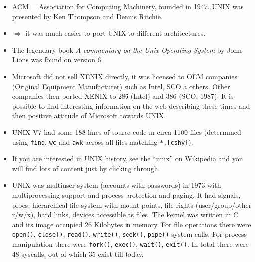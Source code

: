 \begin{itemize}
\item ACM = Association for Computing Machinery, founded in 1947. UNIX was
presented by Ken Thompson and Dennis Ritchie.
\item {} $\Rightarrow$ it was much easier to port UNIX to
different architectures.
\item The legendary book \emph{A commentary on the Unix
Operating System} by John Lions was found on version 6.
\item Microsoft did not sell XENIX directly, it was licensed to OEM companies
(Original Equipment Manufacturer) such as Intel, SCO a others. Other companies
then ported XENIX to 286 (Intel) and 386 (SCO, 1987). It is possible to find
interesting information on the web describing these times and then positive
attitude of Microsoft towards UNIX.
\item UNIX V7 had some 188 lines of source code in circa
1100 files (determined using \texttt{find}, \texttt{wc} and \texttt{awk}
across all files matching \texttt{*.[cshy]}).
\item If you are interested in UNIX history, see the ``u{}nix'' on Wikipedia and
you will find lots of content just by clicking through.
\item UNIX was multiuser system (accounts with passwords) in 1973 with
multiprocessing support and process protection and paging. It had signals,
pipes, hierarchical file system with mount points, file rights (user/group/other
r/w/x), hard links, devices accessible as files. The kernel was written in C
and its image occupied 26 Kilobytes in memory. For file operations there were
\texttt{open()}, \texttt{close()}, \texttt{read()},
\texttt{write()}, \texttt{seek()}, \texttt{pipe()} system calls.
For process manipulation there were \texttt{fork()}, \texttt{exec()},
\texttt{wait()}, \texttt{exit()}. In total there were 48 syscalls, out of which
35 exist till today.
\end{itemize}


